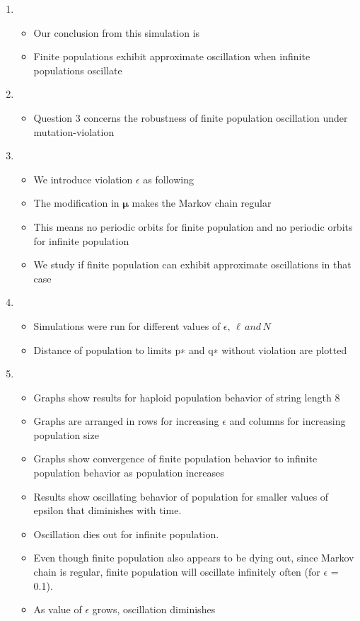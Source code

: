 \documentclass{article}
\begin{document}
\begin{enumerate}
\item
  \begin{itemize}
  \item Our conclusion from this simulation is
   \item Finite populations exhibit approximate oscillation when
     infinite populations oscillate
  \end{itemize}
  
\item
  \begin{itemize}
  \item Question 3 concerns the robustness of finite population oscillation under mutation-violation
  
  \end{itemize}

\item
  \begin{itemize}
  \item We introduce violation $\epsilon$ as following
  \item The modification in $\bm{\mu}$ makes the Markov chain regular
  \item This means no periodic orbits for finite population and no periodic orbits for infinite population
  \item We study if finite population can exhibit approximate oscillations in that case 
  \end{itemize}
  
\item
  \begin{itemize}
  \item Simulations were run for different values of $\epsilon,\, \ell \,and\, N$
  \item Distance of population to limits p∗ and q∗ without violation are plotted  
  \end{itemize}
  
\item
  \begin{itemize}
  \item Graphs show results for haploid population behavior of string length 8
  \item Graphs are arranged in rows for increasing $\epsilon$ and columns for increasing population size
  \item Graphs show convergence of finite population behavior to infinite population behavior as population increases
  \item Results show oscillating behavior of population for smaller values of epsilon that diminishes with time.
  \item Oscillation dies out for infinite population.
  \item Even though finite population also appears to be dying out, since Markov chain is regular, 
  finite population will oscillate infinitely often (for $\epsilon$ = 0.1).
  \item As value of $\epsilon$ grows, oscillation diminishes
  

\end{itemize}
\end{enumerate}
\end{document}
